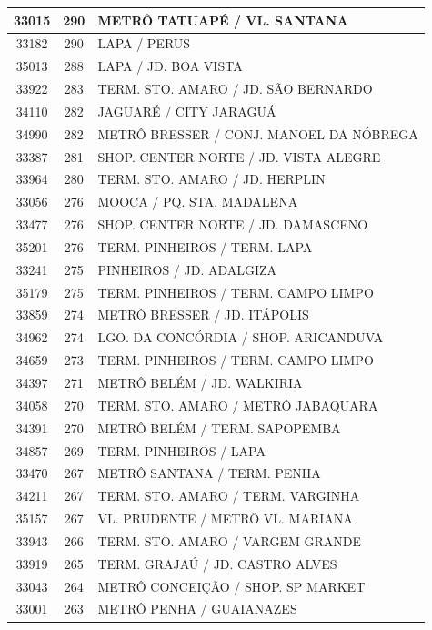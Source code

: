 \documentclass[
	12pt,				%
	oneside,			%
	a4paper,			%
	english,			%
	brazil				%
	]{abntex2ppgsi}
\begin{document}
{{\begin{apendicesenv}
\begin{longtable}{c|c|p{7cm}}
 \hline 
33015 &	290 &	METRÔ TATUAPÉ / VL. SANTANA \\ 
 \hline 
33182 &	290 &	LAPA / PERUS \\ 
 \hline 
35013 &	288 &	LAPA / JD. BOA VISTA \\ 
 \hline 
33922 &	283 &	TERM. STO. AMARO / JD. SÃO BERNARDO \\ 
 \hline 
34110 &	282 &	JAGUARÉ / CITY JARAGUÁ \\ 
 \hline 
34990 &	282 &	METRÔ BRESSER / CONJ. MANOEL DA NÓBREGA \\ 
 \hline 
33387 &	281 &	SHOP. CENTER NORTE / JD. VISTA ALEGRE \\ 
 \hline 
33964 &	280 &	TERM. STO. AMARO / JD. HERPLIN \\ 
 \hline 
33056 &	276 &	MOOCA / PQ. STA. MADALENA \\ 
 \hline 
33477 &	276 &	SHOP. CENTER NORTE / JD. DAMASCENO \\ 
 \hline 
35201 &	276 &	TERM. PINHEIROS / TERM. LAPA \\ 
 \hline 
33241 &	275 &	PINHEIROS / JD. ADALGIZA \\ 
 \hline 
35179 &	275 &	TERM. PINHEIROS / TERM. CAMPO LIMPO \\ 
 \hline 
33859 &	274 &	METRÔ BRESSER / JD. ITÁPOLIS \\ 
 \hline 
34962 &	274 &	LGO. DA CONCÓRDIA / SHOP. ARICANDUVA \\ 
 \hline 
34659 &	273 &	TERM. PINHEIROS / TERM. CAMPO LIMPO \\ 
 \hline 
34397 &	271 &	METRÔ BELÉM / JD. WALKIRIA \\ 
 \hline 
34058 &	270 &	TERM. STO. AMARO / METRÔ JABAQUARA \\ 
 \hline 
34391 &	270 &	METRÔ BELÉM / TERM. SAPOPEMBA \\ 
 \hline 
34857 &	269 &	TERM. PINHEIROS / LAPA \\ 
 \hline 
33470 &	267 &	METRÔ SANTANA / TERM. PENHA \\ 
 \hline 
34211 &	267 &	TERM. STO. AMARO / TERM. VARGINHA \\ 
 \hline 
35157 &	267 &	VL. PRUDENTE / METRÔ VL. MARIANA \\ 
 \hline 
33943 &	266 &	TERM. STO. AMARO / VARGEM GRANDE \\ 
 \hline 
33919 &	265 &	TERM. GRAJAÚ / JD. CASTRO ALVES \\ 
 \hline 
33043 &	264 &	METRÔ CONCEIÇÃO / SHOP. SP MARKET \\ 
 \hline 
33001 &	263 &	METRÔ PENHA / GUAIANAZES \\ 

\end{longtable}
\end{apendicesenv}}}
\end{document}
